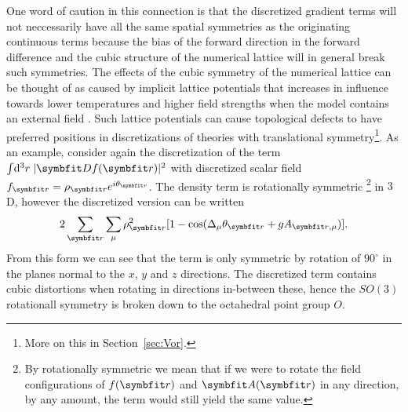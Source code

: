 One word of caution in this connection is that the discretized gradient terms will not neccessarily have all the same spatial symmetries
as the originating continuous terms because the bias of the forward direction in the forward difference and the cubic structure of the numerical
lattice will in general break such symmetries. The effects of the cubic symmetry of the numerical lattice can be thought of as caused by
implicit lattice potentials that increases in influence towards lower temperatures and higher field strengths when the model contains an external
field
. Such lattice potentials can \eg cause topological defects to have
preferred positions in discretizations of theories with translational symmetry\footnote{More on this in Section~\ref{sec:Vor}.}.
As an example, consider again the discretization of the term
$\int\!\mathrm{d}^3r\;|\v{D}f(\v{r})|^2$ with discretized scalar field $f_\v{r}=\rho_\v{r}e^{i\theta_\v{r}}$. The density term is rotationally
symmetric%
\footnote{By rotationally symmetric we mean that if we were to rotate the field configurations of $f(\v{r})$ and $\v{A}(\v{r})$ in any direction,
by any amount, the term would still yield the same value.}
 in $3$D, however the discretized version can be written
\begin{equation}
    \label{eq:LM:Derivatives:discretizedKineticTerm}
    2\sum_\v{r}\sum_\mu\rho_\v{r}^2[1-\cos(\Delta_\mu \theta_\v{r}+gA_{\v{r},\mu})].
\end{equation}
From this form we can see that the term is only symmetric by rotation of $90^\circ$ in the planes normal to the $x$, $y$ and $z$ directions.
The discretized term contains cubic distortions when rotating in directions in-between these, hence the $SO(3)$ rotationall symmetry is broken
down to the octahedral point group $O$.

